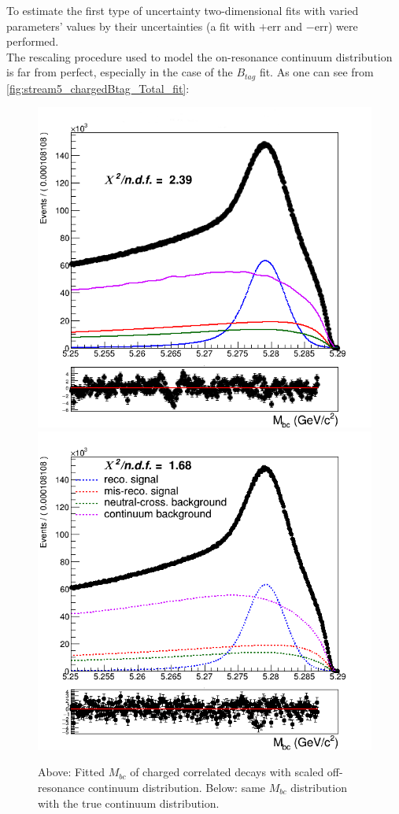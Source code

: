 To estimate the first type of uncertainty two-dimensional fits with varied parameters' values by their uncertainties 
(a fit with $+$err and $-$err) were performed. \\
The rescaling procedure used to model the on-resonance continuum distribution is far from perfect, especially in the case of the $B_{tag}$ fit.
As one can see from \cref{fig:stream5_chargedBtag_Total_fit}:
\\
\begin{figure}[H]
    \centering
    \subcaptionbox{\label{fig:stream5_chargedBtag_Total_fit}}
    {\includegraphics[width=.65\textwidth]{07-LamBR/figs/stream5_chargedBtag_Total_fit.png}} 
    \subcaptionbox{\label{fig:stream5_chargedBtag_TotalFit_TrueContinuum}}
    {\includegraphics[width=.65\textwidth]{07-LamBR/figs/NEW_stream5_chargedBtag_Total_fit_sigmaCB_misReco_Tail_free_usingTrueContinuumPDF_370bins.png}} 
    \caption{Above: Fitted $M_{bc}$ of charged correlated decays with scaled off-resonance continuum distribution. 
    Below: same $M_{bc}$ distribution with the true continuum distribution.}
    \end{figure}
  
